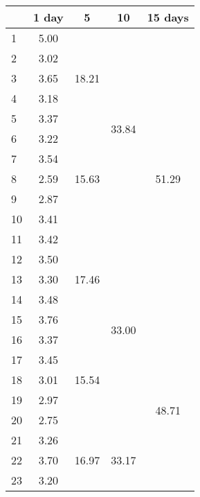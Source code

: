 \begin{center}
\begin{tabular}{| l || c | c | c | c |}\hline
 & 1 day & 5 & 10 & 15 days \\\hline
1 & \multirow{1}{*}{ 5.00 }  & \multirow{5}{*}{ 18.21 }  & \multirow{10}{*}{ 33.84 }  & \multirow{15}{*}{ 51.29 }  \\\cline{2-2}
2 & \multirow{1}{*}{ 3.02 }  & & & \\\cline{2-2}
3 & \multirow{1}{*}{ 3.65 }  & & & \\\cline{2-2}
4 & \multirow{1}{*}{ 3.18 }  & & & \\\cline{2-2}
5 & \multirow{1}{*}{ 3.37 }  & & & \\\cline{2-2}\cline{3-3}
6 & \multirow{1}{*}{ 3.22 }  & \multirow{5}{*}{ 15.63 }  & & \\\cline{2-2}
7 & \multirow{1}{*}{ 3.54 }  & & & \\\cline{2-2}
8 & \multirow{1}{*}{ 2.59 }  & & & \\\cline{2-2}
9 & \multirow{1}{*}{ 2.87 }  & & & \\\cline{2-2}
10 & \multirow{1}{*}{ 3.41 }  & & & \\\cline{2-2}\cline{3-3}\cline{4-4}
11 & \multirow{1}{*}{ 3.42 }  & \multirow{5}{*}{ 17.46 }  & \multirow{10}{*}{ 33.00 }  & \\\cline{2-2}
12 & \multirow{1}{*}{ 3.50 }  & & & \\\cline{2-2}
13 & \multirow{1}{*}{ 3.30 }  & & & \\\cline{2-2}
14 & \multirow{1}{*}{ 3.48 }  & & & \\\cline{2-2}
15 & \multirow{1}{*}{ 3.76 }  & & & \\\cline{2-2}\cline{3-3}\cline{5-5}
16 & \multirow{1}{*}{ 3.37 }  & \multirow{5}{*}{ 15.54 }  & & \multirow{15}{*}{ 48.71 }  \\\cline{2-2}
17 & \multirow{1}{*}{ 3.45 }  & & & \\\cline{2-2}
18 & \multirow{1}{*}{ 3.01 }  & & & \\\cline{2-2}
19 & \multirow{1}{*}{ 2.97 }  & & & \\\cline{2-2}
20 & \multirow{1}{*}{ 2.75 }  & & & \\\cline{2-2}\cline{3-3}\cline{4-4}
21 & \multirow{1}{*}{ 3.26 }  & \multirow{5}{*}{ 16.97 }  & \multirow{10}{*}{ 33.17 }  & \\\cline{2-2}
22 & \multirow{1}{*}{ 3.70 }  & & & \\\cline{2-2}
23 & \multirow{1}{*}{ 3.20 }  & & & \\\cline{2-2}

\end{tabular}
\end{center}
